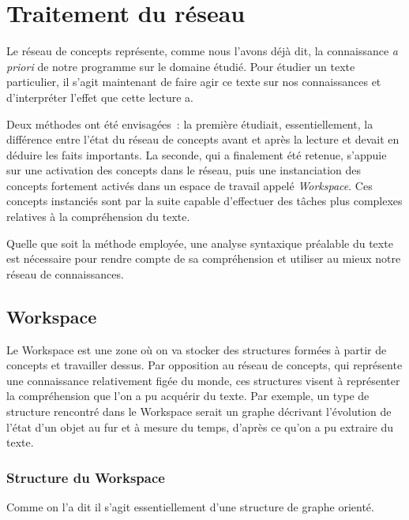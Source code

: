\documentclass[a4paper, 12pt]{article}
\begin{document}



\section{Traitement du réseau}

Le réseau de concepts représente, comme nous l'avons déjà dit, la connaissance \textit{a priori} de notre programme sur le domaine étudié. Pour étudier un texte particulier, il s'agit maintenant de faire agir ce texte sur nos connaissances et d'interpréter l'effet que cette lecture a.

Deux méthodes ont été envisagées~: la première étudiait, essentiellement, la différence entre l'état du réseau de concepts avant et après la lecture et devait en déduire les faits importants. La seconde, qui a finalement été retenue, s'appuie sur une activation des concepts dans le réseau, puis une instanciation des concepts fortement activés dans un espace de travail appelé \textit{Workspace}. Ces concepts instanciés sont par la suite capable d'effectuer des tâches plus complexes relatives à la compréhension du texte.

Quelle que soit la méthode employée, une analyse syntaxique préalable du texte est nécessaire pour rendre compte de sa compréhension et utiliser au mieux notre réseau de connaissances.

\subsection{Workspace}
Le Workspace est une zone où on va stocker des structures formées à partir de concepts et travailler dessus. Par opposition au réseau de concepts, qui représente une connaissance relativement figée du monde, ces structures visent à représenter la compréhension que l'on a pu acquérir du texte.
Par exemple, un type de structure rencontré dans le Workspace serait un graphe décrivant l'évolution de l'état d'un objet au fur et à mesure du temps, d'après ce qu'on a pu extraire du texte.

\subsubsection{Structure du Workspace}
Comme on l'a dit il s'agit essentiellement d'une structure de graphe orienté.
\end{document}
